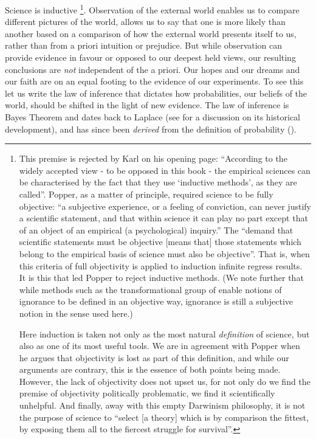 Science is inductive%
\footnote{
This premise is  rejected by Karl \cite{Popper2002} on his opening
page:
``According to the widely accepted view - to be opposed in this book - 
the empirical sciences can be characterised by the fact that they use
`inductive methods', as they are called''.
Popper, as a matter of principle, required science to be fully
objective:
``a subjective experience, or a feeling of conviction, can never
justify a scientific statement, and that within science it can play no
part except that of an object of an empirical (a psychological)
inquiry.''
The ``demand that scientific statements must be objective [means that]
those statements which belong to the empirical basis of science must
also be objective''. 
That is, when this criteria of full objectivity is applied to  induction
infinite regress results.  
It is this that led Popper to reject inductive methods.
(We note further that while methods such as the transformational group of
\cite{Jaynes1973a} enable notions of ignorance to be defined in an
objective way, ignorance is still a subjective notion in the sense
used here.)

Here induction is taken not only as the most natural {\em definition}
of science,
but also as one of its most useful tools.
We are in agreement with Popper when he argues that objectivity is lost as part of
this definition,
and while our arguments are contrary,
this is the essence of both 
points being made.
However, the lack of objectivity does not upset us, 
for not only do we find the premise of objectivity politically
problematic,  we find it scientifically unhelpful.
And finally,
away with this empty Darwinism philosophy,
it is not the purpose of science to ``select [a theory] which is by
comparison the fittest, by exposing them all to the fiercest struggle
for survival''.

%
}.
Observation of the external world enables us to compare different pictures of the world,
allows us to say that one is more likely than another
based on a comparison of how the external world presents itself to us,
rather than from  a priori intuition or prejudice.
But while observation can provide evidence in favour or opposed to our
deepest held views,
our resulting conclusions are  {\em not} independent of the a priori.
Our hopes and our dreams and our faith are on an equal footing to the
evidence of our experiments.
To see this let us write the law of inference
that dictates how probabilities,
our beliefs of the world,
should be shifted in the light of new evidence.
The law of inference is Bayes Theorem and dates back to 
Laplace (see \cite{Jaynes1979} for a discussion on its historical development),
and has since been {\em derived} from the definition of probability
(\cite{Cox1946, Skilling1991}).


